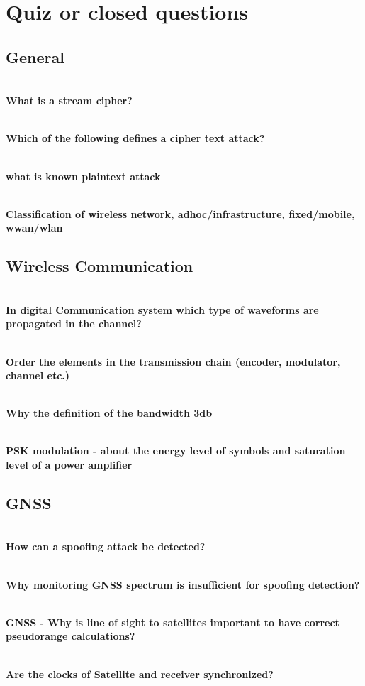 \section{Quiz or closed questions}
\subsection{General}
\textbf{\\What is a stream cipher?}

\textbf{\\Which of the following defines a cipher text attack?}

\textbf{\\what is known plaintext attack}

\textbf{\\Classification of wireless network, adhoc/infrastructure, fixed/mobile, wwan/wlan}

\subsection{Wireless Communication}

\textbf{\\In digital Communication system which type of waveforms are propagated in the channel?}

\textbf{\\Order the elements in the transmission chain (encoder, modulator, channel etc.)}

\textbf{\\Why the definition of the bandwidth 3db}

\textbf{\\PSK modulation - about the energy level of symbols and saturation level of a power amplifier}


\subsection{GNSS}
\textbf{\\How can a spoofing attack be detected?}

\textbf{\\Why monitoring GNSS spectrum is insufficient for spoofing detection?}

\textbf{\\GNSS - Why is line of sight to satellites important to have correct pseudorange calculations?}

\textbf{\\Are the clocks of Satellite and receiver synchronized?}

